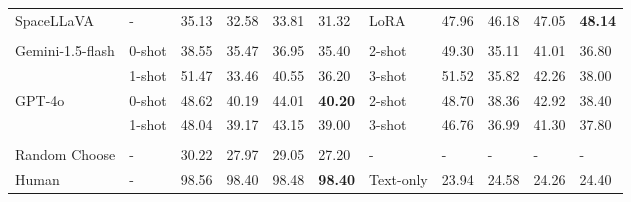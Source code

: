 {\begin{tabular}{p{2.7cm}p{1.4cm}<{}p{1.1cm}<{}p{1.1cm}<{}p{1.1cm}<{}p{1.1cm}<{}p{1.7cm}<{}p{1.1cm}<{}p{1.1cm}<{}p{1.1cm}<{}p{1.4cm}<{}}
SpaceLLaVA     & -                 & 35.13&32.58&33.81&31.32      & LoRA              & 47.96&46.18&47.05&\textbf{48.14}       \\
\cmidrule{1-11}
\rowcolor{gray!15} \multicolumn{11}{c}{\textbf{\textit{Closed-source MLLMs}}}      \\  \midrule
\multirow{2}{*}{Gemini-1.5-flash}     & 0-shot         & 38.55&35.47&36.95&35.40       & 2-shot     &49.30&35.11&41.01&36.80     \\
 & 1-shot         & 51.47&33.46&40.55&36.20        & 3-shot          & 51.52&35.82&42.26&38.00        \\ \cmidrule{2-11}
\multirow{2}{*}{GPT-4o}            & 0-shot         & 48.62&40.19&44.01&\textbf{40.20}        & 2-shot   &   48.70&38.36&42.92&38.40               \\
& 1-shot      &48.04&39.17&43.15&39.00        & 3-shot          &  46.76&36.99&41.30&37.80      \\ \cmidrule{1-11}
\rowcolor{gray!15}\multicolumn{11}{c}{\textbf{\textit{Other Methods}}}   \\  \midrule
Random Choose   & -                 & 30.22&27.97&29.05&27.20        & -                 & -          & -          & -           & -            \\
Human           & -                 & 98.56     & 98.40        & 98.48        & \textbf{98.40}      & Text-only         & 23.94      & 24.58     & 24.26       & 24.40\color{red}{\scriptsize (3)}        \\ \bottomrule
\end{tabular}}

